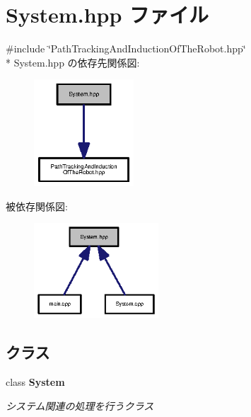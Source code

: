 \section{System.\-hpp ファイル}
\label{_system_8hpp}
{\ttfamily \#include \char`\"{}Path\-Tracking\-And\-Induction\-Of\-The\-Robot.\-hpp\char`\"{}}\\*
System.\-hpp の依存先関係図\-:\nopagebreak
\begin{figure}[H]
\begin{center}
\leavevmode
\includegraphics[width=106pt]{_system_8hpp__incl}
\end{center}
\end{figure}
被依存関係図\-:\nopagebreak
\begin{figure}[H]
\begin{center}
\leavevmode
\includegraphics[width=132pt]{_system_8hpp__dep__incl}
\end{center}
\end{figure}
\subsection*{クラス}
\begin{DoxyCompactItemize}
\item 
class {\bf System}
\begin{DoxyCompactList}\small\item\em システム関連の処理を行うクラス \end{DoxyCompactList}\end{DoxyCompactItemize}
